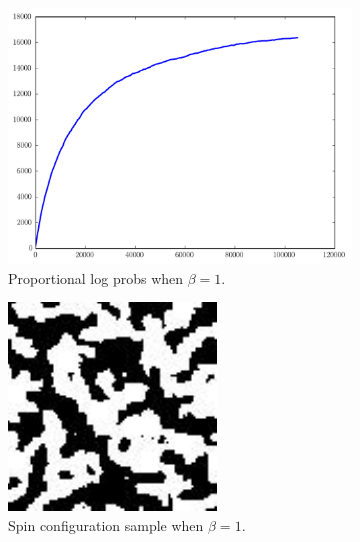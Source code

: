 \begin{figure}
	\begin{subfigure}[b]{.49\textwidth}
		\centering
		\includegraphics[width=\textwidth]{beta1_logprobs.pdf}
		\caption{Proportional log probs when $\beta = 1$.}
		\label{figur:1}
	\end{subfigure}
	\begin{subfigure}[b]{.49\textwidth}
		\centering
		\includegraphics[width=.75\textwidth]{beta1.pdf}
		\caption{Spin configuration sample when $\beta = 1$.}
		\label{figur:2}
	\end{subfigure}
	\begin{subfigure}[b]{.49\textwidth}
		\centering

\end{subfigure}
\end{figure}
